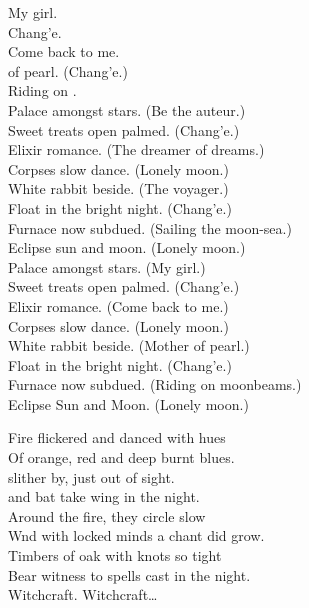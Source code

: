 My girl. \\
Chang'e. \\
Come back to me. \\
 of pearl. (Chang'e.) \\
Riding on . \\

Palace amongst stars. (Be the auteur.) \\
Sweet treats open palmed. (Chang'e.) \\
Elixir romance. (The dreamer of dreams.) \\
Corpses slow dance. (Lonely moon.) \\
White rabbit beside. (The voyager.) \\
Float in the bright night. (Chang'e.) \\
Furnace now subdued. (Sailing the moon-sea.) \\
Eclipse sun and moon. (Lonely moon.) \\

Palace amongst stars. (My girl.) \\
Sweet treats open palmed. (Chang'e.) \\
Elixir romance. (Come back to me.) \\
Corpses slow dance. (Lonely moon.) \\
White rabbit beside. (Mother of pearl.) \\
Float in the bright night. (Chang'e.) \\
Furnace now subdued. (Riding on moonbeams.) \\
Eclipse Sun and Moon. (Lonely moon.) \\


Fire flickered and danced with hues \\
Of orange, red and deep burnt blues. \\
 slither by, just out of sight. \\
 and bat take wing in the night. \\
Around the fire, they circle slow \\
Wnd with locked minds a chant did grow. \\
Timbers of oak with knots so tight \\
Bear witness to spells cast in the night. \\

Witchcraft. Witchcraft… \\

